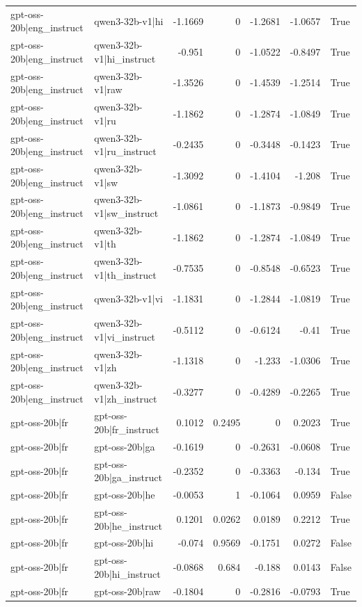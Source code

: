 \begin{table}
\begin{tabular}{l l r r r r l}
gpt-oss-20b|eng_instruct & qwen3-32b-v1|hi & -1.1669 & 0 & -1.2681 & -1.0657 & True \\
gpt-oss-20b|eng_instruct & qwen3-32b-v1|hi_instruct & -0.951 & 0 & -1.0522 & -0.8497 & True \\
gpt-oss-20b|eng_instruct & qwen3-32b-v1|raw & -1.3526 & 0 & -1.4539 & -1.2514 & True \\
gpt-oss-20b|eng_instruct & qwen3-32b-v1|ru & -1.1862 & 0 & -1.2874 & -1.0849 & True \\
gpt-oss-20b|eng_instruct & qwen3-32b-v1|ru_instruct & -0.2435 & 0 & -0.3448 & -0.1423 & True \\
gpt-oss-20b|eng_instruct & qwen3-32b-v1|sw & -1.3092 & 0 & -1.4104 & -1.208 & True \\
gpt-oss-20b|eng_instruct & qwen3-32b-v1|sw_instruct & -1.0861 & 0 & -1.1873 & -0.9849 & True \\
gpt-oss-20b|eng_instruct & qwen3-32b-v1|th & -1.1862 & 0 & -1.2874 & -1.0849 & True \\
gpt-oss-20b|eng_instruct & qwen3-32b-v1|th_instruct & -0.7535 & 0 & -0.8548 & -0.6523 & True \\
gpt-oss-20b|eng_instruct & qwen3-32b-v1|vi & -1.1831 & 0 & -1.2844 & -1.0819 & True \\
gpt-oss-20b|eng_instruct & qwen3-32b-v1|vi_instruct & -0.5112 & 0 & -0.6124 & -0.41 & True \\
gpt-oss-20b|eng_instruct & qwen3-32b-v1|zh & -1.1318 & 0 & -1.233 & -1.0306 & True \\
gpt-oss-20b|eng_instruct & qwen3-32b-v1|zh_instruct & -0.3277 & 0 & -0.4289 & -0.2265 & True \\
gpt-oss-20b|fr & gpt-oss-20b|fr_instruct & 0.1012 & 0.2495 & 0 & 0.2023 & True \\
gpt-oss-20b|fr & gpt-oss-20b|ga & -0.1619 & 0 & -0.2631 & -0.0608 & True \\
gpt-oss-20b|fr & gpt-oss-20b|ga_instruct & -0.2352 & 0 & -0.3363 & -0.134 & True \\
gpt-oss-20b|fr & gpt-oss-20b|he & -0.0053 & 1 & -0.1064 & 0.0959 & False \\
gpt-oss-20b|fr & gpt-oss-20b|he_instruct & 0.1201 & 0.0262 & 0.0189 & 0.2212 & True \\
gpt-oss-20b|fr & gpt-oss-20b|hi & -0.074 & 0.9569 & -0.1751 & 0.0272 & False \\
gpt-oss-20b|fr & gpt-oss-20b|hi_instruct & -0.0868 & 0.684 & -0.188 & 0.0143 & False \\
gpt-oss-20b|fr & gpt-oss-20b|raw & -0.1804 & 0 & -0.2816 & -0.0793 & True \\

\end{tabular}
\end{table}
